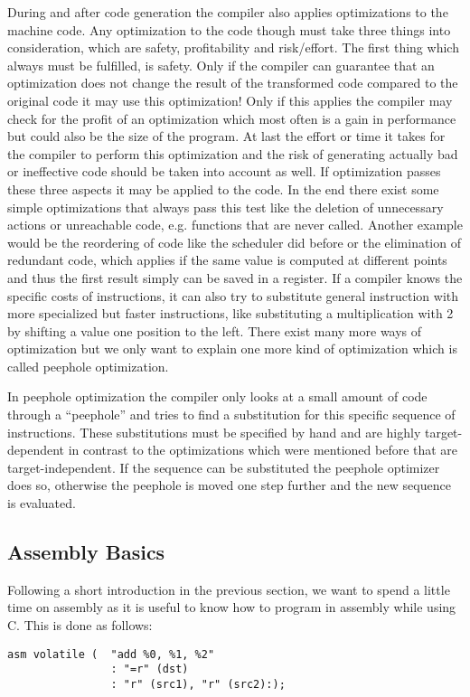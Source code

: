 During and after code generation the compiler also applies optimizations to the machine code.
Any optimization to the code though must take three things into consideration, which are safety, profitability and risk/effort.
The first thing which always must be fulfilled, is safety.
Only if the compiler can guarantee that an optimization does not change the result of the transformed code compared to the original code it may use this optimization!
Only if this applies the compiler may check for the profit of an optimization which most often is a gain in performance but could also be the size of the program.
At last the effort or time it takes for the compiler to perform this optimization and the risk of generating actually bad or ineffective code should be taken into account as well.
If optimization passes these three aspects it may be applied to the code.
In the end there exist some simple optimizations that always pass this test like the deletion of unnecessary actions or unreachable code, e.g. functions that are never called.
Another example would be the reordering of code like the scheduler did before or the elimination of redundant code, which applies if the same value is computed at different points and thus the first result simply can be saved in a register.
If a compiler knows the specific costs of instructions, it can also try to substitute general instruction with more specialized but faster instructions, like substituting a multiplication with 2 by shifting a value one position to the left.
There exist many more ways of optimization but we only want to explain one more kind of optimization which is called peephole optimization.

In peephole optimization the compiler only looks at a small amount of code through a ``peephole'' and tries to find a substitution for this specific sequence of instructions.
These substitutions must be specified by hand and are highly target-dependent in contrast to the optimizations which were mentioned before that are target-independent.
If the sequence can be substituted the peephole optimizer does so, otherwise the peephole is moved one step further and the new sequence is evaluated.

\subsection{Assembly Basics}
\label{section:asm}
Following a short introduction in the previous section, we want to spend a little time on assembly as it is useful to know how to program in assembly while using C.
This is done as follows:
\begin{lstlisting}[caption= Exemplatory Assembly invkation, label=lst:asm]
asm volatile (  "add %0, %1, %2"
                : "=r" (dst)
                : "r" (src1), "r" (src2):);
\end{lstlisting}

